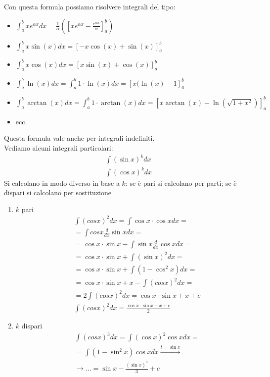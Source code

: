 Con questa formula possiamo risolvere integrali del tipo:
\begin{itemize}
    \item $\int_{a}^{b} xe^{\alpha x} dx = \frac{1}{\alpha} \left(\left[xe^{\alpha x}- \frac{e^{\alpha x}}{\alpha}\right]_a^b\right)$
    \item $\int_{a}^{b} x\sin(x) dx = \left[-x\cos(x) + \sin(x)\right]_a^b$
    \item $\int_{a}^{b} x\cos(x) dx = \left[x\sin(x) + \cos(x)\right]_a^b$
    \item $\int_{a}^{b} \ln(x) dx = \int_{a}^{b} 1\cdot \ln(x) dx = \left[x(\ln(x) - 1\right]_a^b$
    \item $\int_{a}^{b} \arctan(x) dx = \int_{a}^{b} 1\cdot \arctan(x) dx = \left[x\arctan(x) - \ln\left(\sqrt{1+x^2}\right)\right]_a^b$
    \item ecc.
\end{itemize}
Questa formula vale anche per integrali indefiniti. \\
Vediamo alcuni integrali particolari:
\begin{gather}
    \int (\sin x)^k dx \\
    \int (\cos x)^k dx
\end{gather}
Si calcolano in modo diverso in base a $k$: se è pari si calcolano per parti; se è dispari si calcolano per sostituzione
\begin{enumerate}
    \item $k$ pari
        \begin{align*}
            &\int (cos x)^2 dx = \int \cos x \cdot \cos x dx = \\
            &= \int cos x \frac{d}{dx}\sin x dx = \\
            &= \cos x \cdot \sin x - \int \sin x \frac{d}{dx}\cos x dx = \\
            &= \cos x \cdot \sin x + \int (\sin x)^2 dx = \\
            &= \cos x \cdot \sin x + \int (1-\cos^2 x)dx = \\
            &= \cos x \cdot \sin x + x - \int (cos x)^2 dx = \\
            &=  2\int(cos x)^2 dx = \cos x\cdot \sin x + x + c \\
            &\int (cos x)^2 dx = \frac{\cos x\cdot \sin x + x + c}{2}
        \end{align*}
    \item $k$ dispari
        \begin{align*}
            &\int (cos x)^3 dx = \int(\cos x)^2 \cos x dx = \\
            &= \int(1-\sin^2 x) \cos x dx \xrightarrow{t = \sin x} \\
            &\rightarrow ... = \sin x - \frac{(\sin x)^3}{3} + c
        \end{align*}
\end{enumerate}

